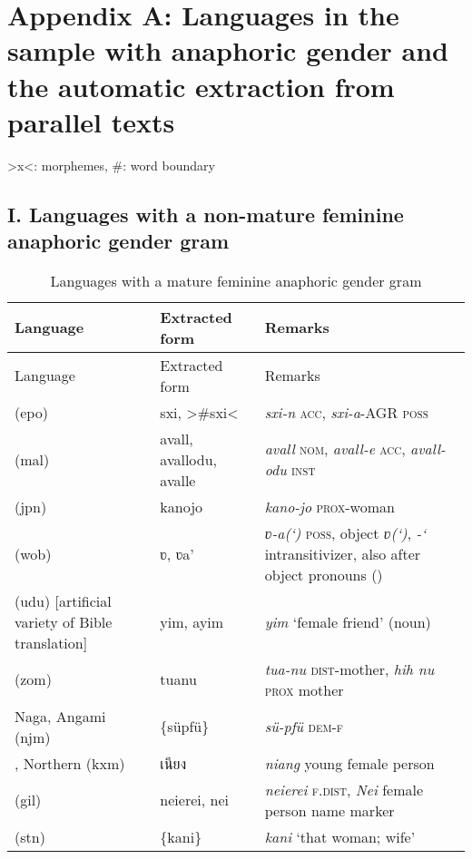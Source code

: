 
\section*{Appendix A: Languages in the sample with anaphoric gender and the automatic extraction from parallel texts}

\noindent >x<: morphemes, \#: word boundary


\subsection*{I. Languages with a non-mature feminine anaphoric gender gram \normalfont [59 languages]}

{\small\begin{longtable}{L{.25\textwidth}L{.25\textwidth}L{.5\textwidth}}
\caption{Languages with a mature feminine anaphoric gender gram}\\
\lsptoprule Language & Extracted form & Remarks\\\midrule\endfirsthead
\midrule    Language & Extracted form & Remarks\\\midrule\endhead
\endfoot\lspbottomrule\endlastfoot
{} (epo)	&	sxi, >\#sxi<	&	\textit{sxi-n} \textsc{acc}, \textit{sxi-a}-AGR \textsc{poss}	\\
 (mal)	&	avall, avallodu, avalle	&	\textit{avall} \textsc{nom}, \textit{avall-e} \textsc{acc}, \textit{avall-odu} \textsc{inst}	\\
 (jpn)	&	kanojo	&	\textit{kano-jo} \textsc{prox}-woman	\\
 (wob)	&	ʋ, ʋa’	&	\textit{ʋ-a(‘)} \textsc{poss}, object \textit{ʋ(‘)}, \textit{-‘} intransitivizer, also after object pronouns (\citealt{Paradis1983})	\\
 (udu) [artificial variety of Bible translation]	&	yim, ayim	&	\textit{yim} ‘female friend’ (noun)	\\
 (zom)	&	tuanu	&	\textit{tua-nu} \textsc{dist}-mother, \textit{hih nu} \textsc{prox} mother	\\
Naga, Angami (njm)	&	\{süpfü\}	&	\textit{sü-pfü} \textsc{dem-f}	\\
, Northern (kxm)	&	\textkhmer{เนียง}	&	\textit{niang} young female person 	\\
 (gil)	&	neierei, nei	&	\textit{neierei} \textsc{f.dist}, \textit{Nei} female person name marker	\\
 (stn)	&	\{kani\}	&	\textit{kani} ‘that woman; wife’	\\

\end{longtable}}
